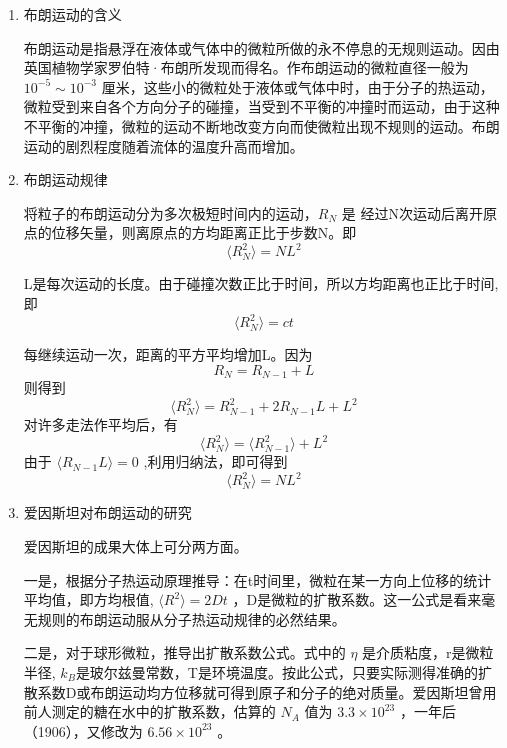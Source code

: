 \documentclass[12pt,a4paper,UTF8]{ctexart}
\begin{document}
\begin{enumerate}
    \item 布朗运动的含义

布朗运动是指悬浮在液体或气体中的微粒所做的永不停息的无规则运动。因由英国植物学家罗伯特·布朗所发现而得名。作布朗运动的微粒直径一般为 $10^{-5} \sim 10^{-3}$ 厘米，这些小的微粒处于液体或气体中时，由于分子的热运动，微粒受到来自各个方向分子的碰撞，当受到不平衡的冲撞时而运动，由于这种不平衡的冲撞，微粒的运动不断地改变方向而使微粒出现不规则的运动。布朗运动的剧烈程度随着流体的温度升高而增加。
    \item 布朗运动规律

将粒子的布朗运动分为多次极短时间内的运动，$R_N$ 是
经过N次运动后离开原点的位移矢量，则离原点的方均距离正比于步数N。即
\begin{equation}
		\langle R_N^2\rangle =NL^2
	\end{equation}

L是每次运动的长度。由于碰撞次数正比于时间，所以方均距离也正比于时间,即
\begin{equation}
		\langle R_N^2\rangle =ct
	\end{equation}

每继续运动一次，距离的平方平均增加L。因为
\begin{equation}
		R_N=R_{N-1}+L
	\end{equation}
则得到
\begin{equation}
		\langle R_N^2\rangle =R_{N-1}^2+2R_{N-1}L+L^2
	\end{equation}
对许多走法作平均后，有
\begin{equation}
		\langle R_N^2\rangle =\langle R_{N-1}^2\rangle +L^2
	\end{equation}
由于 $\langle R_{N-1}L\rangle=0$ ,利用归纳法，即可得到
\begin{equation}
		\langle R_N^2\rangle =NL^2
	\end{equation}

	\item 爱因斯坦对布朗运动的研究

爱因斯坦的成果大体上可分两方面。

一是，根据分子热运动原理推导：在t时间里，微粒在某一方向上位移的统计平均值，即方均根值, $\langle R^2 \rangle=2Dt$ ，D是微粒的扩散系数。这一公式是看来毫无规则的布朗运动服从分子热运动规律的必然结果。

二是，对于球形微粒，推导出扩散系数公式。式中的 $\eta$ 是介质粘度，r是微粒半径, $k_B$是玻尔兹曼常数，T是环境温度。按此公式，只要实际测得准确的扩散系数D或布朗运动均方位移就可得到原子和分子的绝对质量。爱因斯坦曾用前人测定的糖在水中的扩散系数，估算的 $N_A$ 值为 $3.3 \times 10^{23}$ ，一年后（1906），又修改为 $6.56 \times 10^{23}$ 。


\end{enumerate}
\end{document}
